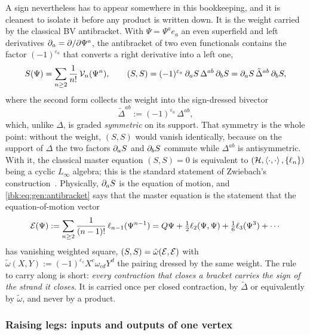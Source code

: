 A sign nevertheless has to appear somewhere in this bookkeeping, and it is cleanest to isolate it before any product is written down. It is the weight carried by the classical BV antibracket. With $\Psi=\Psi^ae_a$ an even superfield and left derivatives $\partial_a=\partial/\partial\Psi^a$, the antibracket of two even functionals contains the factor $(-1)^{\varepsilon_a}$ that converts a right derivative into a left one,
\begin{equation}
  \label{ibk:eq:gen:antibracket}
  S(\Psi)
    = \sum_{n\ge2}\frac{1}{n!}\,{\mathcal{V}}_n(\Psi^n),
  \qquad
  (S,S)
    = (-1)^{\varepsilon_a}\,\partial_aS\,\Delta^{ab}\,\partial_bS
    = \partial_aS\,\tilde\Delta^{ab}\,\partial_bS,
\end{equation}
where the second form collects the weight into the sign-dressed bivector
\begin{equation}
  \label{ibk:eq:gen:tilde-delta}
  \tilde\Delta^{ab}
    := (-1)^{\varepsilon_a}\,\Delta^{ab},
\end{equation}
which, unlike $\Delta$, is graded \emph{symmetric} on its support. That symmetry is the whole point: without the weight, $(S,S)$ would vanish identically, because on the support of $\Delta$ the two factors $\partial_aS$ and $\partial_bS$ commute while $\Delta^{ab}$ is antisymmetric. With it, the classical master equation $(S,S)=0$ is equivalent to $({\mathcal{H}},\braket{\cdot,\cdot},\{\ell_n\})$ being a cyclic $L_\infty$ algebra; this is the standard statement of Zwiebach's construction~\cite{Zwiebach:1993:ClosedStringField}. Physically, $\partial_aS$ is the equation of motion, and \eqref{ibk:eq:gen:antibracket} says that the master equation is the statement that the equation-of-motion vector
\begin{equation}
  \label{ibk:eq:gen:eom}
  {\mathcal{E}}(\Psi)
    := \sum_{n\ge2}\frac{1}{(n-1)!}\,\ell_{n-1}(\Psi^{n-1})
    = Q\Psi+\tfrac12\ell_2(\Psi,\Psi)+\tfrac16\ell_3(\Psi^3)+\cdots
\end{equation}
has vanishing weighted square, $(S,S)=\tilde\omega({\mathcal{E}},{\mathcal{E}})$ with $\tilde\omega(X,Y):=(-1)^{\varepsilon_c}X^c\omega_{cd}Y^d$ the pairing dressed by the same weight. The rule to carry along is short: \emph{every contraction that closes a bracket carries the sign of the strand it closes}. It is carried once per closed contraction, by $\tilde\Delta$ or equivalently by $\tilde\omega$, and never by a product.

\subsubsection{Raising legs: inputs and outputs of one vertex}
\label{ibk:sec:gen:raising}

